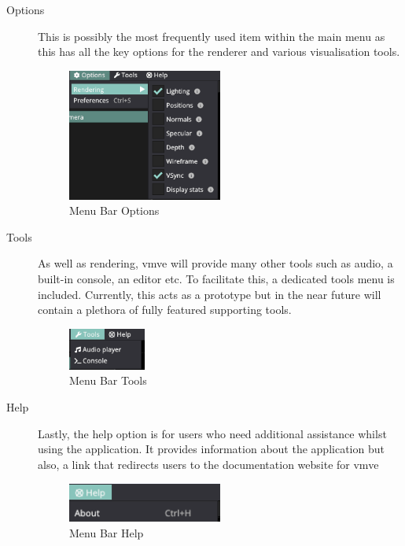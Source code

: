 \documentclass[11pt]{article}
\begin{document}
\begin{description}
  \item[Options] 
    This is possibly the most frequently used item within the main menu as this
    has all the key options for the renderer and various visualisation tools.
    \begin{figure}[H]
      \centering
      \includegraphics[width=0.5\textwidth]{images/menu_bar_options.png}
      \caption{Menu Bar Options}
      \label{fig:menu_bar_options}
    \end{figure}
  \item[Tools] 
    As well as rendering, \gls*{vmve} will provide many other tools such as
    audio, a built-in console, an editor etc. To facilitate this, a dedicated
    tools menu is included. Currently, this acts as a prototype but in the near
    future will contain a plethora of fully featured supporting tools.
    \begin{figure}[H]
      \centering
      \includegraphics[width=0.25\textwidth]{images/menu_bar_tools.png}
      \caption{Menu Bar Tools}
      \label{fig:menu_bar_tools}
    \end{figure}
  \item[Help]
    Lastly, the help option is for users who need additional assistance whilst
    using the application. It provides information about the application but
    also, a link that redirects users to the documentation website for
    \gls*{vmve}
    \begin{figure}[H]
      \centering
      \includegraphics[width=0.5\textwidth]{images/menu_bar_help.png}
      \caption{Menu Bar Help}
      \label{fig:menu_bar_help}
    \end{figure}
\end{description}
\end{document}
